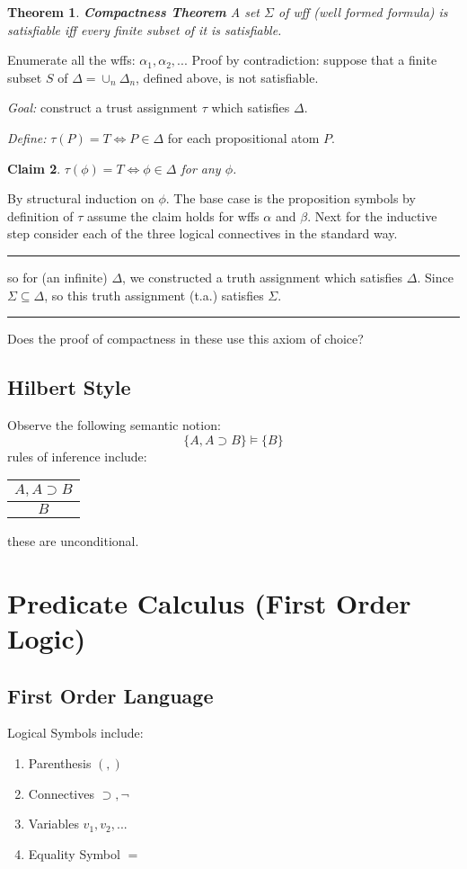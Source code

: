 \documentclass[twoside]{article}
\newcounter{lecnum}
\newtheorem{theorem}{Theorem}[lecnum]
\newtheorem{claim}[theorem]{Claim}
\newenvironment{proof}{{\bf Proof:}}{\hfill\rule{2mm}{2mm}}
\begin{document}
\begin{theorem}
\textbf{Compactness Theorem} A set $\Sigma$ of wff (well formed formula) is satisfiable iff every finite subset of it is satisfiable. 
\end{theorem}
\begin{proof}
Enumerate all the wffs: $\alpha_1, \alpha_2, ...$ 
Proof by contradiction: suppose that a finite subset $S$ of $\Delta = \cup_{n} \Delta_n$, defined above, is not satisfiable.  

\textit{Goal:} construct a trust assignment $\tau$ which satisfies $\Delta$.

\textit{Define:} $\tau(P) = T \iff P \in \Delta$ for each propositional atom $P$.

\begin{claim}
$\tau(\phi) = T \iff \phi \in \Delta$ for any $\phi$.
\end{claim}
\begin{proof}
By structural induction on $\phi$. The base case is the proposition symbols by definition of $\tau$  assume the claim holds for wffs $\alpha$ and $\beta$. Next for the inductive step consider each of the three logical connectives in the standard way.  
\end{proof}

so for (an infinite) $\Delta$, we constructed a truth assignment which satisfies $\Delta$. Since $\Sigma \subseteq \Delta$, so this truth assignment (t.a.) satisfies $\Sigma$. 

\end{proof}

Does the proof of compactness in these use this axiom of choice?

\subsection{Hilbert Style}
Observe the following semantic notion:
\[\{A, A \supset B\} \vDash \{B\}\]
rules of inference include:
\begin{tabular}{c}
$A, A \supset B$ \\
\hline
$B$ \\
\end{tabular}
these are unconditional.

\section{Predicate Calculus (First Order Logic)}
\subsection{First Order Language}
Logical Symbols include:
\begin{enumerate}
\item Parenthesis $(,)$
\item Connectives $\supset, \lnot$
\item Variables $v_1, v_2, ...$
\item Equality Symbol $=$
\end{enumerate}
\end{document}

